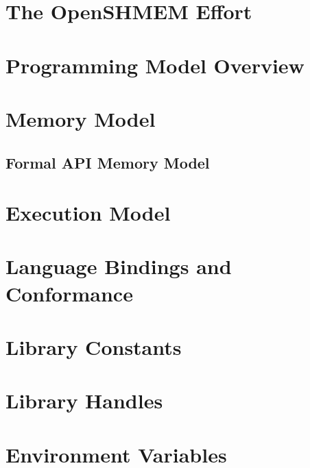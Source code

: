 \documentclass[10pt,oneside]{book}
\begin{document}




\section{The OpenSHMEM Effort}\label{subsec:openshmem_effort}


\section{Programming Model Overview}\label{subsec:programming_model}


\section{Memory Model}\label{subsec:memory_model}


\subsection{Formal API Memory Model}\label{subsec:api_mem_model}


\section{Execution Model}\label{subsec:execution_model}


\section{Language Bindings and Conformance}\label{subsec:bindings}


\section{Library Constants}\label{subsec:library_constants}


\section{Library Handles}\label{subsec:library_handles}


\section{Environment Variables }\label{subsec:environment_variables}

\end{document}
